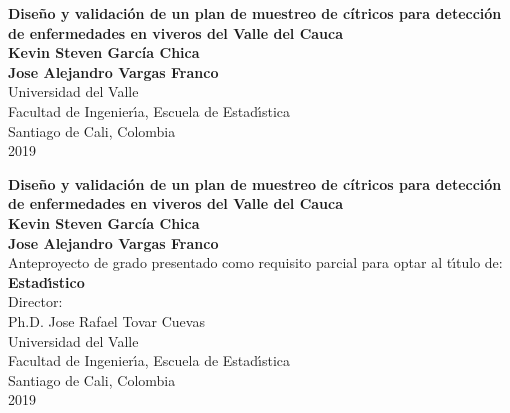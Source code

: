 
\begin{center}
\begin{figure}
\centering
{}
\end{figure}

\thispagestyle{empty}
\vspace*{2.0cm}

\textbf{\huge Dise\~{n}o y validaci\'{o}n de un plan de muestreo de c\'{i}tricos para detecci\'{o}n de enfermedades en viveros del Valle del Cauca}\\[5.0cm]

\Large\textbf{Kevin Steven Garc\'{i}a Chica}\\
\Large\textbf{Jose Alejandro Vargas Franco}\\[4.0cm]
\small Universidad del Valle\\
Facultad de Ingenier\'{\i}a, Escuela de Estad\'{\i}stica\\
Santiago de Cali, Colombia\\
2019\\
\end{center}

\newpage{\pagestyle{empty}\cleardoublepage}

\newpage

\begin{center}
\thispagestyle{empty}
\vspace*{0cm}

\textbf{\huge Dise\~{n}o y validaci\'{o}n de un plan de muestreo de c\'{i}tricos para detecci\'{o}n de enfermedades en viveros del Valle del Cauca}\\[3.5cm]

\Large\textbf{Kevin Steven Garc\'{i}a Chica}\\
\Large\textbf{Jose Alejandro Vargas Franco}\\[3.0cm]
\small Anteproyecto de grado presentado como requisito parcial para optar al t\'{\i}tulo de:\\
\textbf{Estad\'{\i}stico}\\[2.5cm]
Director:\\
Ph.D. Jose Rafael Tovar Cuevas\\[4.0cm]
Universidad del Valle\\
Facultad de Ingenier\'{\i}a, Escuela de Estad\'{\i}stica\\
Santiago de Cali, Colombia\\
2019\\
\end{center}

\newpage{\pagestyle{empty}\cleardoublepage}